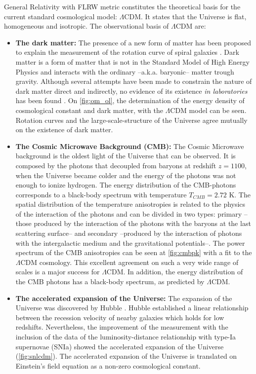 General Relativity with FLRW metric constitutes the theoretical basis for the current standard cosmological model: $\Lambda$CDM. It states that the Universe is flat, homogeneous and isotropic. The observational basis of $\Lambda$CDM are:
\begin{itemize}
\item {\bf The dark matter:} The presence of a new form of matter has been proposed to explain the measurement of the rotation curve of spiral galaxies \cite{1982ApJ...253...70B,1983Sci...220.1339R,1985ApJ...297..423B,1985ApJ...289...81R}. Dark matter is a form of matter that is not in the Standard Model of High Energy Physics and interacts with the ordinary --a.k.a. baryonic-- matter trough gravity. Although several attempts have been made to constrain the nature of dark matter direct and indirectly, no evidence of its existence {\it in laboratories} has been found  \cite{2016JPhG...43a3001M,2016ConPh..57..496G}. On \autoref{fig:om_ol}, the determination of the energy density of cosmological constant and dark matter, with the $\Lambda$CDM model can be seen. Rotation curves and the large-scale-structure of the Universe agree mutually on the existence of dark matter.

\item {\bf The Cosmic Microwave Background (CMB):} The Cosmic Microwave background is the oldest light of the Universe that can be observed. It is composed by the photons that decoupled from baryons at redshift $z=1100$, when the Universe became colder and the energy of the photons was not enough to ionize hydrogen. The energy distribution of the CMB-photons corresponds to a black-body spectrum with temperature $T_{CMB}=2.72$ K. The spatial distribution of the temperature anisotropies is related to the physics of the interaction of the photons and can be divided in two types: primary --those produced by the interaction of the photons with the baryons at the last scattering surface-- and secondary --produced by the interaction of photons with the intergalactic medium and the gravitational potentials--. The power spectrum of the CMB anisotropies can be seen at \autoref{fig:cmbpk} with a fit to the $\Lambda$CDM cosmology. This excellent agreement on such a very wide range of scales is a major success for $\Lambda$CDM. In addition, the energy distribution of the CMB photons has a black-body spectrum, as predicted by $\Lambda$CDM.

\item {\bf The accelerated expansion of the Universe:} The expansion of the Universe was discovered by Hubble \cite{1929PNAS...15..168H}. Hubble established a linear relationship between the recession velocity of nearby galaxies which holds for low redshifts. Nevertheless, the improvement of the measurement with the inclusion of the data of the luminosity-distance relationship with type-Ia supernovae (SNIa) showed the accelerated expansion of the Universe \cite{1999ApJ...517..565P} (\autoref{fig:snlcdm}). The accelerated expansion of the Universe is translated on Einstein's field equation as a non-zero cosmological constant.


\end{itemize}
